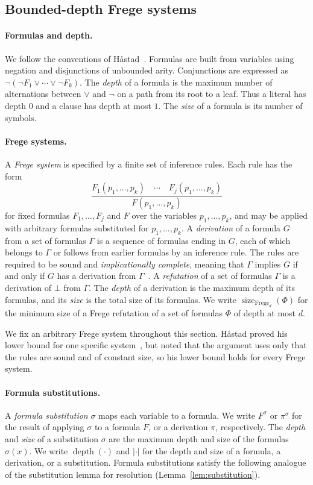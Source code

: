 \documentclass[11pt]{article}
\theoremstyle{definition}
\theoremstyle{remark}
\newcommand{\sizeF}[1]{\operatorname{size}_{\mathrm{Frege}_{#1}}}
\begin{document}
\subsection{Bounded-depth Frege systems}
\label{sec:frege-prelims}

\paragraph{Formulas and depth.}
We follow the conventions of H\r{a}stad~\cite{hastad-php}. Formulas are built from variables using negation and disjunctions of unbounded arity. Conjunctions are expressed as $\neg(\neg F_1\vee\cdots\vee\neg F_k)$. The \emph{depth} of a formula is the maximum number of alternations between $\vee$ and $\neg$ on a path from its root to a leaf. Thus a literal has depth $0$ and a clause has depth at most $1$. The \emph{size} of a formula is its number of symbols.

\paragraph{Frege systems.}
A \emph{Frege system} is specified by a finite set of inference rules. Each rule has the form
\[
\frac{F_1(p_1,\ldots,p_k)\quad\cdots\quad F_j(p_1,\ldots,p_k)}{F(p_1,\ldots,p_k)}
\]
for fixed formulas $F_1,\ldots,F_j$ and $F$ over the variables $p_1,\ldots,p_k$, and may be applied with arbitrary formulas substituted for $p_1,\ldots,p_k$. A \emph{derivation} of a formula $G$ from a set of formulas $\Gamma$ is a sequence of formulas ending in $G$, each of which belongs to $\Gamma$ or follows from earlier formulas by an inference rule. The rules are required to be sound and \emph{implicationally complete}, meaning that $\Gamma$ implies $G$ if and only if $G$ has a derivation from $\Gamma$~\cite{cook-reckhow}. A \emph{refutation} of a set of formulas $\Gamma$ is a derivation of $\bot$ from $\Gamma$. The \emph{depth} of a derivation is the maximum depth of its formulas, and its \emph{size} is the total size of its formulas. We write $\sizeF{d}(\Phi)$ for the minimum size of a Frege refutation of a set of formulas $\Phi$ of depth at most $d$.

We fix an arbitrary Frege system throughout this section. H\r{a}stad proved his lower bound for one specific system~\cite[Section~2.2]{hastad-php}, but noted that the argument uses only that the rules are sound and of constant size, so his lower bound holds for every Frege system.

\paragraph{Formula substitutions.}
A \emph{formula substitution} $\sigma$ maps each variable to a formula. We write $F^\sigma$ or $\pi^\sigma$ for the result of applying $\sigma$ to a formula $F$, or a derivation $\pi$, respectively. The \emph{depth} and \emph{size} of a substitution $\sigma$ are the maximum depth and size of the formulas $\sigma(x)$. We write $\operatorname{depth}(\cdot)$ and $|\cdot|$ for the depth and size of a formula, a derivation, or a substitution. Formula substitutions satisfy the following analogue of the substitution lemma for resolution (Lemma~\ref{lem:substitution}).
\end{document}
